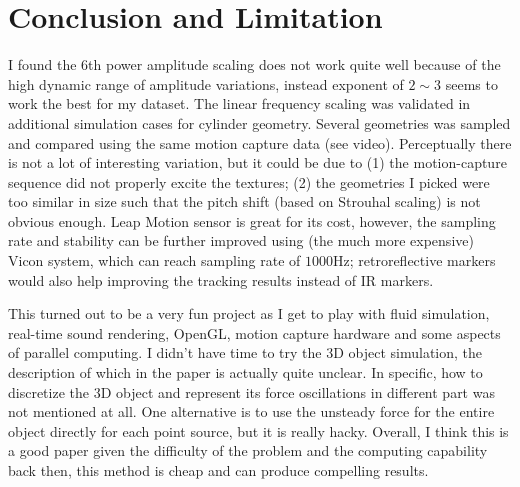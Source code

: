 \documentclass[tog]{acmsiggraph}
\begin{document}
\section{Conclusion and Limitation}

I found the 6th power amplitude scaling does not work quite well because of the high dynamic range of amplitude variations, instead exponent of $2\sim3$ seems to work the best for my dataset. The linear frequency scaling was validated in additional simulation cases for cylinder geometry. Several geometries was sampled and compared using the same motion capture data (see video). Perceptually there is not a lot of interesting variation, but it could be due to (1) the motion-capture sequence did not properly excite the textures; (2) the geometries I picked were too similar in size such that the pitch shift (based on Strouhal scaling) is not obvious enough. Leap Motion sensor is great for its cost, however, the sampling rate and stability can be further improved using (the much more expensive) Vicon system, which can reach sampling rate of $1000$Hz; retroreflective markers would also help improving the tracking results instead of IR markers. 


This turned out to be a very fun project as I get to play with fluid simulation, real-time sound rendering, OpenGL, motion capture hardware and some aspects of parallel computing. I didn't have time to try the 3D object simulation, the description of which in the paper is actually quite unclear. In specific, how to discretize the 3D object and represent its force oscillations in different part was not mentioned at all. One alternative is to use the unsteady force for the entire object directly for each point source, but it is really hacky. Overall, I think this is a good paper given the difficulty of the problem and the computing capability back then, this method is cheap and can produce compelling results. 




\end{document}
